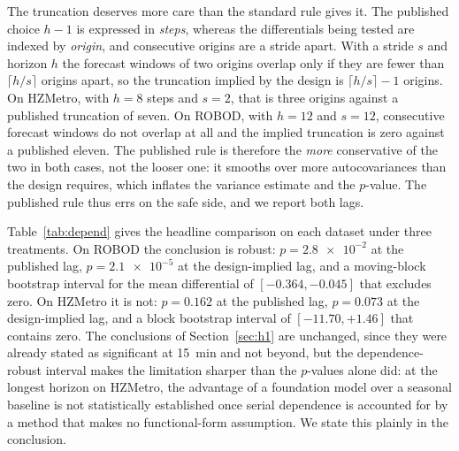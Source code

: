 \documentclass[utf8]{FrontiersinHarvard}
\newif\ifrevisionmarkup
\newcommand{\new}[1]{\ifrevisionmarkup\textcolor{revision}{#1}\else#1\fi}
\newif\ifsecondrevisionmarkup
\newcommand{\rev}[1]{\ifsecondrevisionmarkup\textcolor{revisiontwo}{#1}\else#1\fi}
\theoremstyle{plain}
\theoremstyle{definition}
\theoremstyle{remark}
\begin{document}
\new{The truncation deserves more care than the standard rule gives it. The published choice $h-1$ is expressed in \emph{steps}, whereas the differentials being tested are indexed by \emph{origin}, and consecutive origins are a stride apart. With a stride $s$ and horizon $h$ the forecast windows of two origins overlap only if they are fewer than $\lceil h/s \rceil$ origins apart, so the truncation implied by the design is $\lceil h/s\rceil - 1$ origins. On HZMetro, with $h=8$ steps and $s=2$, that is three origins against a published truncation of seven. On ROBOD, with $h=12$ and $s=12$, consecutive forecast windows do not overlap at all and the implied truncation is zero against a published eleven. The published rule is therefore the \emph{more} conservative of the two in both cases, not the looser one: it smooths over more autocovariances than the design requires, which inflates the variance estimate and the $p$-value. \rev{The published rule thus errs on the safe side, and we report both lags.}}

\new{Table~\ref{tab:depend} gives the headline comparison on each dataset under three treatments. On ROBOD the conclusion is robust: $p = \num{2.8e-2}$ at the published lag, $p = \num{2.1e-5}$ at the design-implied lag, and a moving-block bootstrap interval for the mean differential of $[-0.364, -0.045]$ that excludes zero. On HZMetro it is not: $p = \num{0.162}$ at the published lag, $p = \num{0.073}$ at the design-implied lag, and a block bootstrap interval of $[-11.70, +1.46]$ that contains zero. The conclusions of Section~\ref{sec:h1} are unchanged, since they were already stated as significant at \SI{15}{\minute} and not beyond, but the dependence-robust interval makes the limitation sharper than the $p$-values alone did: at the longest horizon on HZMetro, the advantage of a foundation model over a seasonal baseline is not statistically established once serial dependence is accounted for by a method that makes no functional-form assumption. We state this plainly in the conclusion.}
\end{document}
